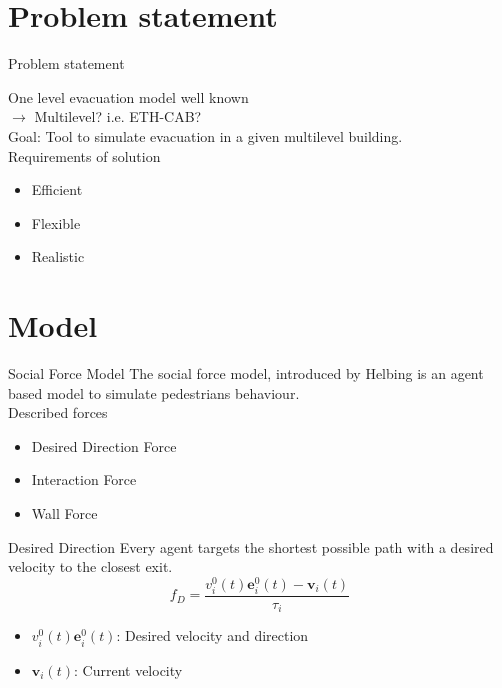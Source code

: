 \section{Problem statement}

\begin{frame}{Problem statement}

One level evacuation model well known \\
$\rightarrow$  Multilevel? i.e. ETH-CAB?\\
Goal: Tool to simulate evacuation in a given multilevel building.\\
Requirements of solution
\begin{itemize}
\item Efficient
\item Flexible
\item Realistic
\end{itemize}

\end{frame}


\section{Model}

\begin{frame}{Social Force Model}
The social force model, introduced by Helbing is an agent based model to simulate pedestrians behaviour.\\
Described forces
\begin{itemize}
\item Desired Direction Force
\item Interaction Force
\item Wall Force
\end{itemize}
\end{frame}

\begin{frame}{Desired Direction}
Every agent targets the shortest possible path with a desired velocity to the closest exit.
\begin{equation*}
f_{D}=\frac{v_{i}^{0}(t)\mathbf{e}_{i}^{0}(t)-\mathbf{v}_{i}(t)}{\tau_{i}}
\end{equation*}
\begin{itemize}
\item $v_{i}^{0}(t)\mathbf{e}_{i}^{0}(t)$: Desired velocity and direction
\item $\mathbf{v}_{i}(t)$: Current velocity
\end{itemize}
\end{frame}

